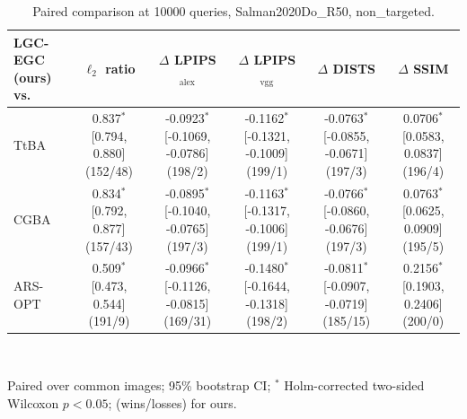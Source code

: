 \begin{table}[t]
\centering\footnotesize
\caption{Paired comparison at 10000 queries, Salman2020Do\_R50, non\_targeted.}
\begin{tabular}{lccccc}
\toprule
LGC-EGC (ours) vs. & $\ell_2$ ratio & $\Delta$ LPIPS$_{\mathrm{alex}}$ & $\Delta$ LPIPS$_{\mathrm{vgg}}$ & $\Delta$ DISTS & $\Delta$ SSIM \\
\midrule
TtBA & 0.837$^{*}$ [0.794, 0.880] (152/48) & -0.0923$^{*}$ [-0.1069, -0.0786] (198/2) & -0.1162$^{*}$ [-0.1321, -0.1009] (199/1) & -0.0763$^{*}$ [-0.0855, -0.0671] (197/3) & 0.0706$^{*}$ [0.0583, 0.0837] (196/4) \\
CGBA & 0.834$^{*}$ [0.792, 0.877] (157/43) & -0.0895$^{*}$ [-0.1040, -0.0765] (197/3) & -0.1163$^{*}$ [-0.1317, -0.1006] (199/1) & -0.0766$^{*}$ [-0.0860, -0.0676] (197/3) & 0.0763$^{*}$ [0.0625, 0.0909] (195/5) \\
ARS-OPT & 0.509$^{*}$ [0.473, 0.544] (191/9) & -0.0966$^{*}$ [-0.1126, -0.0815] (169/31) & -0.1480$^{*}$ [-0.1644, -0.1318] (198/2) & -0.0811$^{*}$ [-0.0907, -0.0719] (185/15) & 0.2156$^{*}$ [0.1903, 0.2406] (200/0) \\
\bottomrule
\end{tabular}
\\[2pt]\parbox{\linewidth}{\scriptsize Paired over common images; 95\% bootstrap CI; $^{*}$ Holm-corrected two-sided Wilcoxon $p<0.05$; (wins/losses) for ours.}
\end{table}
